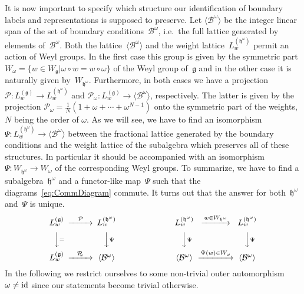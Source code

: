\documentclass[12pt,a4paper]{article}
\newcommand{\proj}{\mc{P}_{\!\!\omega}}
\newcommand{\mf}{\mathfrak} %
\newcommand{\mc}{\mathcal} %
\def\Iso{\Psi}
\def\sg{\mf{h}^\omega} %
\def\bL{\mc{B}} %
\def\treps{\bL^\omega} %
\def\id{{\rm id}}
\begin{document}
\begin{appendix}
It is now important to specify  which structure our identification 
of boundary labels and representations is supposed to preserve. Let 
$\langle\treps\rangle$ be the integer linear span of the set of 
boundary conditions~$\treps$, i.e.\ the full lattice generated by
elements of~$\treps$. Both the lattice~$\langle\treps\rangle$ and 
the weight lattice~$L_w^{(\sg)}$ permit an action of Weyl groups. 
In the first case this group is given by the symmetric part
$W_{\omega}=\{w\in W_{\mf{g}}|\omega\circ w=w\circ\omega\}$ of 
the Weyl group of~$\mf{g}$ and in the other case it is naturally 
given by~$W_{\sg}$. Furthermore, in both cases we have a projection
$\mc{P}:L_w^{(\mf{g})}\rightarrow L_w^{(\sg)}$ and
$\proj:L_w^{(\mf{g})}\rightarrow\langle\treps\rangle$,
respectively. The latter is given by the projection $\proj
=\frac{1}{N}(1+\omega+\cdots+\omega^{N-1})$ onto the symmetric part
of the weights, $N$ being the order of $\omega$.
As we will see, we have to find an isomorphism $\Iso:L_w^{(\sg)}
\rightarrow \langle\treps\rangle$ between the fractional lattice 
generated by the boundary conditions and the weight lattice of the 
subalgebra which preserves all of these structures. In particular
it should be accompanied with an isomorphism
$\Iso:W_{\sg}\to W_\omega$ of the corresponding Weyl groups.
To summarize, we 
have to find a subalgebra~$\sg$ and a functor-like map~$\Iso$ such
that the diagrams~\eqref{eq:CommDiagram} commute. It turns out
that the answer for both~$\sg$ and~$\Iso$ is unique.
\begin{equation}
  \label{eq:CommDiagram}
\begin{CD}
  L_w^{(\mf{g})} @>{\mc{P}}>> L_w^{(\sg)} &\hspace{2.5cm}&  L_w^{(\sg)} @>w\in W_{\sg}>> L_w^{(\sg)}\\
  @VV{=}V @VV{\Iso}V  @VV{\Iso}V @VV{\Iso}V\\
  L_w^{(\mf{g})} @>{\proj}>> \langle\treps\rangle &\hspace{2.5cm}& \langle\treps\rangle @>\Iso(w)\in W_\omega>>\langle\treps\rangle
\end{CD}
\end{equation}
In the following we restrict ourselves to some non-trivial outer
automorphism~$\omega\neq\id$ since our statements become trivial
otherwise.
\smallskip


\end{appendix}
\end{document}
